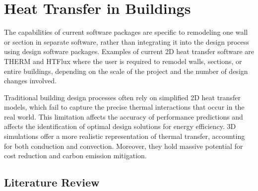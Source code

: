 \chapter{Heat Transfer in Buildings}



The capabilities of current software packages are specific to remodeling one wall or section in separate software, rather than integrating it into the design process using design software packages. Examples of current 2D heat transfer software are THERM and HTFlux where
the user is required to remodel walls, sections, or entire buildings, depending on the scale of the project and the number of design changes involved.

Traditional building design processes often rely on simplified 2D heat transfer models, which fail to capture the precise thermal interactions that occur in the real world. This limitation affects the accuracy of performance predictions and affects the identification of optimal design solutions for energy efficiency. 
3D simulations offer a more realistic representation of thermal transfer, accounting for both conduction and convection. 
Moreover, they hold massive potential for cost reduction and carbon emission mitigation. 






\section{Literature Review}






